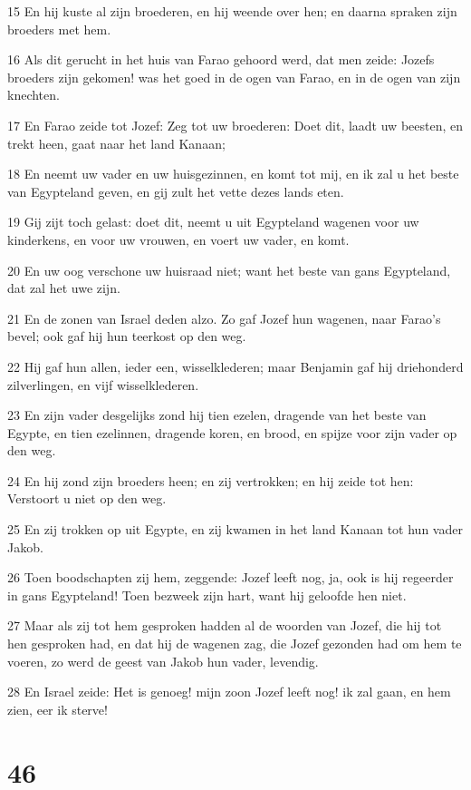 \par 15 En hij kuste al zijn broederen, en hij weende over hen; en daarna spraken zijn broeders met hem.
\par 16 Als dit gerucht in het huis van Farao gehoord werd, dat men zeide: Jozefs broeders zijn gekomen! was het goed in de ogen van Farao, en in de ogen van zijn knechten.
\par 17 En Farao zeide tot Jozef: Zeg tot uw broederen: Doet dit, laadt uw beesten, en trekt heen, gaat naar het land Kanaan;
\par 18 En neemt uw vader en uw huisgezinnen, en komt tot mij, en ik zal u het beste van Egypteland geven, en gij zult het vette dezes lands eten.
\par 19 Gij zijt toch gelast: doet dit, neemt u uit Egypteland wagenen voor uw kinderkens, en voor uw vrouwen, en voert uw vader, en komt.
\par 20 En uw oog verschone uw huisraad niet; want het beste van gans Egypteland, dat zal het uwe zijn.
\par 21 En de zonen van Israel deden alzo. Zo gaf Jozef hun wagenen, naar Farao's bevel; ook gaf hij hun teerkost op den weg.
\par 22 Hij gaf hun allen, ieder een, wisselklederen; maar Benjamin gaf hij driehonderd zilverlingen, en vijf wisselklederen.
\par 23 En zijn vader desgelijks zond hij tien ezelen, dragende van het beste van Egypte, en tien ezelinnen, dragende koren, en brood, en spijze voor zijn vader op den weg.
\par 24 En hij zond zijn broeders heen; en zij vertrokken; en hij zeide tot hen: Verstoort u niet op den weg.
\par 25 En zij trokken op uit Egypte, en zij kwamen in het land Kanaan tot hun vader Jakob.
\par 26 Toen boodschapten zij hem, zeggende: Jozef leeft nog, ja, ook is hij regeerder in gans Egypteland! Toen bezweek zijn hart, want hij geloofde hen niet.
\par 27 Maar als zij tot hem gesproken hadden al de woorden van Jozef, die hij tot hen gesproken had, en dat hij de wagenen zag, die Jozef gezonden had om hem te voeren, zo werd de geest van Jakob hun vader, levendig.
\par 28 En Israel zeide: Het is genoeg! mijn zoon Jozef leeft nog! ik zal gaan, en hem zien, eer ik sterve!

\chapter{46}


